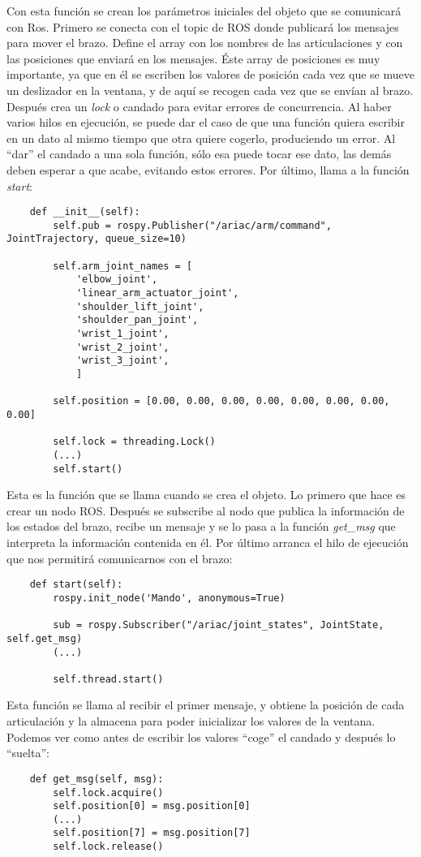 \begin{itemize}
	Con esta función se crean los parámetros iniciales del objeto que se comunicará con Ros. Primero se conecta con el topic de ROS donde publicará los mensajes para mover el brazo. Define el array con los nombres de las articulaciones y con las posiciones que enviará en los mensajes. Éste array de posiciones es muy importante, ya que en él se escriben los valores de posición cada vez que se mueve un deslizador en la ventana, y de aquí se recogen cada vez que se envían al brazo. Después crea un \textit{lock} o candado para evitar errores de concurrencia. Al haber varios hilos en ejecución, se puede dar el caso de que una función quiera escribir en un dato al mismo tiempo que otra quiere cogerlo, produciendo un error. Al “dar” el candado a una sola función, sólo esa puede tocar ese dato, las demás deben esperar a que acabe, evitando estos errores. Por último, llama a la función \textit{start}:
	\begin{lstlisting}
	def __init__(self):
		self.pub = rospy.Publisher("/ariac/arm/command", JointTrajectory, queue_size=10)
		
		self.arm_joint_names = [
			'elbow_joint',
			'linear_arm_actuator_joint',
			'shoulder_lift_joint',
			'shoulder_pan_joint',
			'wrist_1_joint',
			'wrist_2_joint',
			'wrist_3_joint',
			]
			
		self.position = [0.00, 0.00, 0.00, 0.00, 0.00, 0.00, 0.00, 0.00]
		
		self.lock = threading.Lock()
		(...)
		self.start()
	\end{lstlisting}
	
	Esta es la función que se llama cuando se crea el objeto. Lo primero que hace es crear un nodo ROS. Después se subscribe al nodo que publica la información de los estados del brazo, recibe un mensaje y se lo pasa a la función \textit{get\_msg} que interpreta la información contenida en él. Por último arranca el hilo de ejecución que nos permitirá comunicarnos con el brazo:
	\begin{lstlisting}
	def start(self):
		rospy.init_node('Mando', anonymous=True)

		sub = rospy.Subscriber("/ariac/joint_states", JointState, self.get_msg)
		(...)
	
		self.thread.start()
	\end{lstlisting}
	
	Esta función se llama al recibir el primer mensaje, y obtiene la posición de cada articulación y la almacena para poder inicializar los valores de la ventana. Podemos ver como antes de escribir los valores “coge” el candado y después lo “suelta”:
	\begin{lstlisting}
	def get_msg(self, msg):
		self.lock.acquire()
		self.position[0] = msg.position[0]
		(...)
		self.position[7] = msg.position[7]
		self.lock.release()
	\end{lstlisting}
	

\end{itemize}
